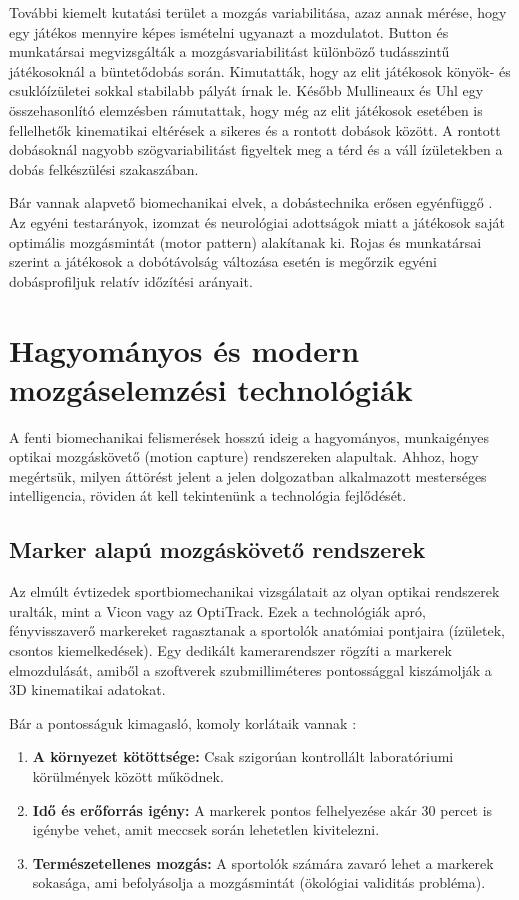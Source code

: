 További kiemelt kutatási terület a mozgás variabilitása, azaz annak mérése, hogy egy játékos mennyire képes ismételni ugyanazt a mozdulatot. Button és munkatársai \cite{Button2003} megvizsgálták a mozgásvariabilitást különböző tudásszintű játékosoknál a büntetődobás során. Kimutatták, hogy az elit játékosok könyök- és csuklóízületei sokkal stabilabb pályát írnak le. Később Mullineaux és Uhl \cite{Mullineaux2010} egy összehasonlító elemzésben rámutattak, hogy még az elit játékosok esetében is fellelhetők kinematikai eltérések a sikeres és a rontott dobások között. A rontott dobásoknál nagyobb szögvariabilitást figyeltek meg a térd és a váll ízületekben a dobás felkészülési szakaszában.

Bár vannak alapvető biomechanikai elvek, a dobástechnika erősen egyénfüggő \cite{Brisson1996, PenichetTomas2018}. Az egyéni testarányok, izomzat és neurológiai adottságok miatt a játékosok saját optimális mozgásmintát (motor pattern) alakítanak ki. Rojas és munkatársai \cite{Robins2006} szerint a játékosok a dobótávolság változása esetén is megőrzik egyéni dobásprofiljuk relatív időzítési arányait.

\section{Hagyományos és modern mozgáselemzési technológiák}
A fenti biomechanikai felismerések hosszú ideig a hagyományos, munkaigényes optikai mozgáskövető (motion capture) rendszereken alapultak. Ahhoz, hogy megértsük, milyen áttörést jelent a jelen dolgozatban alkalmazott mesterséges intelligencia, röviden át kell tekintenünk a technológia fejlődését.

\subsection{Marker alapú mozgáskövető rendszerek}
Az elmúlt évtizedek sportbiomechanikai vizsgálatait az olyan optikai rendszerek uralták, mint a Vicon vagy az OptiTrack. Ezek a technológiák apró, fényvisszaverő markereket ragasztanak a sportolók anatómiai pontjaira (ízületek, csontos kiemelkedések). Egy dedikált kamerarendszer rögzíti a markerek elmozdulását, amiből a szoftverek szubmilliméteres pontossággal kiszámolják a 3D kinematikai adatokat.

Bár a pontosságuk kimagasló, komoly korlátaik vannak \cite{Verhoeven2021}:
\begin{enumerate}
    \item \textbf{A környezet kötöttsége:} Csak szigorúan kontrollált laboratóriumi körülmények között működnek.
    \item \textbf{Idő és erőforrás igény:} A markerek pontos felhelyezése akár 30 percet is igénybe vehet, amit meccsek során lehetetlen kivitelezni.
    \item \textbf{Természetellenes mozgás:} A sportolók számára zavaró lehet a markerek sokasága, ami befolyásolja a mozgásmintát (ökológiai validitás probléma).
\end{enumerate}

